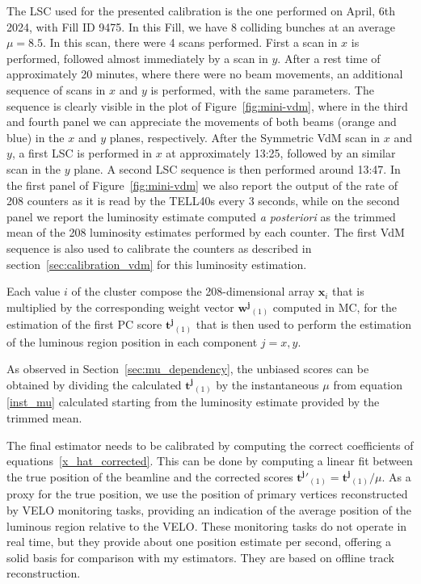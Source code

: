 The LSC used for the presented calibration is the one performed on April, 6th 2024, with Fill ID 9475. In this Fill, we have 8 colliding bunches at an average $\mu=8.5$. In this scan, there were 4 scans performed. First a scan in $x$ is performed, followed almost immediately by a scan in $y$. After a rest time of approximately 20 minutes, where there were no beam movements, an additional sequence of scans in $x$ and $y$ is performed, with the same parameters. The sequence is clearly visible in the plot of Figure~\ref{fig:mini-vdm}, where in the third and fourth panel we can appreciate the movements of both beams (orange and blue) in the $x$ and $y$ planes, respectively. After the Symmetric VdM scan in $x$ and $y$, a first LSC is performed in $x$ at approximately 13:25, followed by an similar scan in the $y$ plane. A second LSC sequence is then performed around 13:47. In the first panel of Figure~\ref{fig:mini-vdm} we also report the output of the rate of 208 counters as it is read by the TELL40s every 3 seconds, while on the second panel we report the luminosity estimate computed \textit{a posteriori} as the trimmed mean of the 208 luminosity estimates performed by each counter. The first VdM sequence is also used to calibrate the counters as described in section~\ref{sec:calibration_vdm} for this luminosity estimation. 

Each value $i$ of the cluster compose the 208-dimensional array $\mathbf{x}_i$ that is multiplied by the corresponding weight vector $\mathbf{w^j}_{(1)}$ computed in MC, for the estimation of the first PC score $\mathbf{t^j}_{(1)}$ that is then used to perform the estimation of the luminous region position in each component $j=x,y$. 

As observed in Section~\ref{sec:mu_dependency}, the unbiased scores can be obtained by dividing the calculated $\mathbf{t^j}_{(1)}$ by the instantaneous $\mu$ from equation \eqref{inst_mu} calculated starting from the luminosity estimate provided by the trimmed mean.

The final estimator needs to be calibrated by computing the correct coefficients of equations~\ref{x_hat_corrected}. This can be done by computing a linear fit between the true position of the beamline and the corrected scores $\mathbf{t^j}'_{(1)}=\mathbf{t^j}_{(1)}/\mu$. As a proxy for the true position, we use the position of primary vertices reconstructed by VELO monitoring tasks, providing an indication of the average position of the luminous region relative to the VELO. These monitoring tasks do not operate in real time, but they provide about one position estimate per second, offering a solid basis for comparison with my estimators. They are based on offline track reconstruction.

